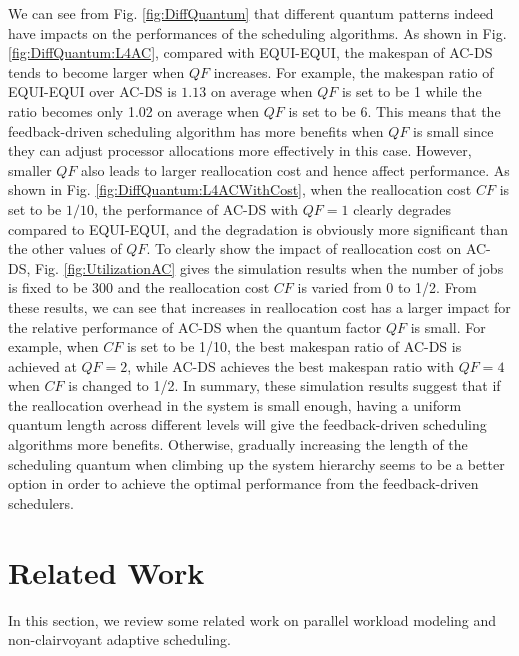 \documentclass[10pt, a4paper]{article}
\begin{document}
We can see from Fig. \ref{fig:DiffQuantum} that different quantum patterns indeed have impacts on
the performances of the scheduling algorithms. As shown in Fig. \ref{fig:DiffQuantum:L4AC},
compared with EQUI-EQUI, the makespan of AC-DS tends to become larger when $QF$ increases. For
example, the makespan ratio of EQUI-EQUI over AC-DS is $1.13$ on average when $QF$ is set to be 1
while the ratio becomes only 1.02 on average when $QF$ is set to be 6. This means that the
feedback-driven scheduling algorithm has more benefits when $QF$ is small since they can adjust
processor allocations more effectively in this case. However, smaller $QF$ also leads to larger
reallocation cost and hence affect performance. As shown in Fig.
\ref{fig:DiffQuantum:L4ACWithCost}, when the reallocation cost $CF$ is set to be $1/10$, the
performance of AC-DS with $QF=1$ clearly degrades compared to EQUI-EQUI, and the degradation is
obviously more significant than the other values of $QF$. To clearly show the impact of
reallocation cost on AC-DS, Fig. \ref{fig:UtilizationAC} gives the simulation results when the
number of jobs is fixed to be 300 and the reallocation cost $CF$ is varied from 0 to 1/2. From
these results, we can see that increases in reallocation cost has a larger impact for the relative
performance of AC-DS when the quantum factor $QF$ is small. For example, when $CF$ is set to be
1/10, the best makespan ratio of AC-DS is achieved at $QF=2$, while AC-DS achieves the best
makespan ratio with $QF=4$ when $CF$ is changed to 1/2. In summary, these simulation results
suggest that if the reallocation overhead in the system is small enough, having a uniform quantum
length across different levels will give the feedback-driven scheduling algorithms more benefits.
Otherwise, gradually increasing the length of the scheduling quantum when climbing up the system
hierarchy seems to be a better option in order to achieve the optimal performance from the
feedback-driven schedulers.

\section{Related Work}

In this section, we review some related work on parallel workload modeling and non-clairvoyant
adaptive scheduling.
\end{document}
